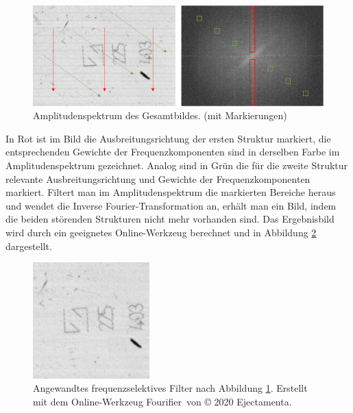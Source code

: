 \begin{figure}[H]
	\centering
	\includegraphics[width=\textwidth]{03_sichtpruefungDurchLichtstreuung/optimierungen/figures/amplitudeSpectrum}
	\caption[Amplitudenspektrum des Gesamtbildes]{Amplitudenspektrum des Gesamtbildes. (mit Markierungen)}
	\label{img:amplitudeSpectrum}
\end{figure}

\noindent
In Rot ist im Bild die Ausbreitungsrichtung der ersten Struktur markiert, die entsprechenden Gewichte der Frequenzkomponenten sind in derselben Farbe im Amplitudenspektrum gezeichnet.
Analog sind in Grün die für die zweite Struktur relevante Ausbreitungsrichtung und Gewichte der Frequenzkomponenten markiert.
Filtert man im Amplitudenspektrum die markierten Bereiche heraus und wendet die Inverse Fourier-Transformation an, erhält man ein Bild, indem die beiden störenden Strukturen nicht mehr vorhanden sind.
Das Ergebnisbild wird durch ein geeignetes Online-Werkzeug \cite{fourierTool} berechnet und in Abbildung \ref{img:frequencyFiltered} dargestellt.

\begin{figure}[H]
	\centering
	\includegraphics[width=0.4\textwidth]{03_sichtpruefungDurchLichtstreuung/optimierungen/figures/frequencyFiltered}
	\caption[Bild mit angewandtem frequenzselektives Filter]{Angewandtes frequenzselektives Filter nach Abbildung \ref{img:amplitudeSpectrum}. Erstellt mit dem Online-Werkzeug \glqq Fourifier\grqq ~von © 2020 Ejectamenta.\cite{fourierTool}\footnotemark}
	\label{img:frequencyFiltered}
\end{figure}

